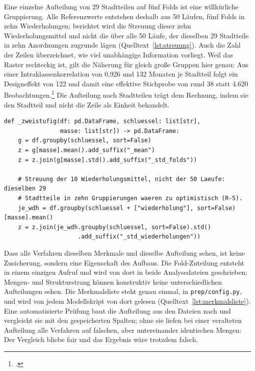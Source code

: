 Eine einzelne Aufteilung von 29 Stadtteilen auf fünf Folds ist eine
willkürliche Gruppierung. Alle Referenzwerte entstehen deshalb aus 50 Läufen,
fünf Folds in zehn Wiederholungen; berichtet wird die Streuung dieser zehn
Wiederholungsmittel und nicht die über alle 50 Läufe, der dieselben 29
Stadtteile in zehn Anordnungen zugrunde lägen (Quelltext~\ref{lst:streuung}).
Auch die Zahl der Zeilen überzeichnet, wie viel unabhängige Information
vorliegt. Weil das Raster rechteckig ist, gilt die Näherung für gleich große
Gruppen hier genau: Aus einer Intraklassenkorrelation von 0,926 und 132 Monaten
je Stadtteil folgt ein Designeffekt von 122 und damit eine effektive Stichprobe
von rund 38 statt 4.620 Beobachtungen.\footcite[206]{Killip2004} Die Aufteilung
nach Stadtteilen trägt dem Rechnung, indem sie den Stadtteil und nicht die
Zeile als Einheit behandelt.

\begin{lstlisting}[style=pythonstil,
  label={lst:streuung},
  caption={Zweistufige Mittelung über die zehn Wiederholungen
           (\texttt{vorpruefung/v1\_baselines.py}, Z.~181--206, gekürzt)}]
def _zweistufig(df: pd.DataFrame, schluessel: list[str],
                masse: list[str]) -> pd.DataFrame:
    g = df.groupby(schluessel, sort=False)
    z = g[masse].mean().add_suffix("_mean")
    z = z.join(g[masse].std().add_suffix("_std_folds"))

    # Streuung der 10 Wiederholungsmittel, nicht der 50 Laeufe: dieselben 29
    # Stadtteile in zehn Gruppierungen waeren zu optimistisch (R-5).
    je_wdh = df.groupby(schluessel + ["wiederholung"], sort=False)[masse].mean()
    z = z.join(je_wdh.groupby(schluessel, sort=False).std()
                     .add_suffix("_std_wiederholungen"))
\end{lstlisting}

Dass alle Verfahren dieselben Merkmale und dieselbe Aufteilung sehen, ist keine
Zusicherung, sondern eine Eigenschaft des Aufbaus. Die Fold-Zuteilung entsteht
in einem einzigen Aufruf und wird von dort in beide Analysedateien geschrieben;
Mengen- und Strukturstrang können konstruktiv keine unterschiedlichen
Aufteilungen sehen. Die Merkmalsliste steht genau einmal, in
\texttt{prep/config.py}, und wird von jedem Modellskript von dort gelesen
(Quelltext~\ref{lst:merkmalsliste}). Eine automatisierte Prüfung baut die
Aufteilung aus den Dateien nach und vergleicht sie mit den gespeicherten
Spalten; ohne sie liefen bei einer veralteten Aufteilung alle Verfahren auf
falschen, aber untereinander identischen Mengen: Der Vergleich bliebe fair und
das Ergebnis wäre trotzdem falsch.

